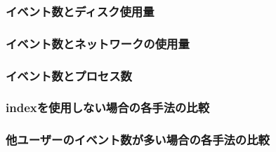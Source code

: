 \documentclass[../../main]{subfiles}
\begin{document}
    \subsubsection{イベント数とディスク使用量}\label{subsubsec:result-disk}
    \subsubsection{イベント数とネットワークの使用量}\label{subsubsec:result-network}
    \subsubsection{イベント数とプロセス数}\label{subsubsec:result-process}
    \subsubsection{indexを使用しない場合の各手法の比較}\label{subsubsec:result-without-index}
    \subsubsection{他ユーザーのイベント数が多い場合の各手法の比較}\label{subsubsec:result-other-user}

    \clearpage
\end{document}
